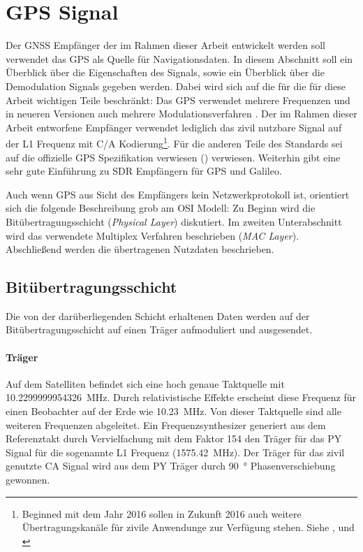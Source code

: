 \section{GPS Signal}
Der GNSS Empfänger der im Rahmen dieser Arbeit entwickelt werden soll verwendet das \gls{GPS} als Quelle für Navigationsdaten. In diesem Abschnitt soll ein Überblick über die Eigenschaften des Signals, sowie ein Überblick über die Demodulation Signals gegeben werden. Dabei wird sich auf die für die für diese Arbeit wichtigen Teile beschränkt: Das GPS verwendet mehrere Frequenzen und in neueren Versionen auch mehrere Modulationsverfahren \cite{specification2010gps}. Der im Rahmen dieser Arbeit entworfene Empfänger verwendet lediglich das zivil nutzbare Signal auf der L1 Frequenz mit C/A Kodierung\footnote{Beginned mit dem Jahr 2016 sollen in Zukunft 2016 auch weitere Übertragungskanäle für zivile Anwendunge zur Verfügung stehen. Siehe \cite{interface1gps}, \cite{specification2010gps} und \cite{navstar2006space}}. Für die anderen Teile des Standards sei auf die offizielle GPS Spezifikation verwiesen (\cite{specification2010gps}) verwiesen. Weiterhin gibt \cite{borre2007software} eine sehr gute Einführung zu \gls{SDR} Empfängern für \gls{GPS} und Galileo. 

Auch wenn GPS aus Sicht des Empfängers kein Netzwerkprotokoll ist, orientiert sich die folgende Beschreibung grob am OSI Modell: Zu Beginn wird die Bitübertragungsschicht (\emph{Physical Layer}) diskutiert. Im zweiten Unterabschnitt wird das verwendete Multiplex Verfahren beschrieben (\emph{\gls{MAC} Layer}). Abschließend werden die übertragenen Nutzdaten beschrieben.

\subsection{Bitübertragungsschicht}
Die von der darüberliegenden Schicht erhaltenen Daten werden auf der Bitübertragungsschicht auf einen Träger aufmoduliert und ausgesendet. 

\paragraph{Träger} 
Auf dem Satelliten befindet sich eine hoch genaue Taktquelle mit \SI{10.2299999954326}{\MHz}. Durch relativistische Effekte erscheint diese Frequenz für einen Beobachter auf der Erde wie \SI{10.23}{\MHz}. Von dieser Taktquelle sind alle weiteren Frequenzen abgeleitet. Ein Frequenzsynthesizer generiert aus dem Referenztakt durch Vervielfachung mit dem Faktor 154 den Träger für das \gls{PY} Signal für die sogenannte L1 Frequenz (\SI{1575.42}{\MHz}). Der Träger für das zivil genutzte \gls{CA} Signal wird aus dem \gls{PY} Träger durch \SI{90}{\degree} Phasenverschiebung gewonnen.

